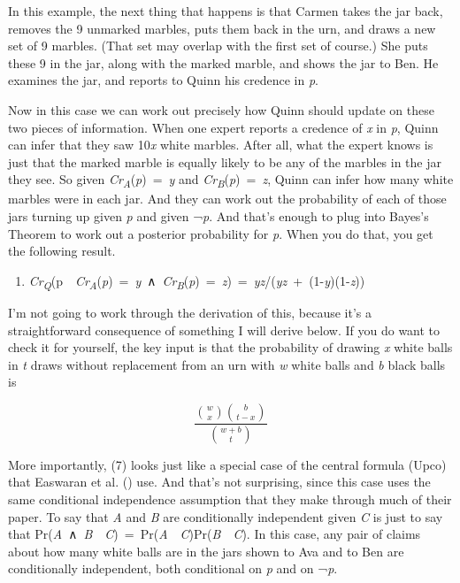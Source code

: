 \documentclass[
  11pt,
  letterpaper,
  DIV=11,
  numbers=noendperiod,
  twoside]{scrartcl}
\providecommand{\tightlist}{%
  \setlength{\itemsep}{0pt}\setlength{\parskip}{0pt}}
\begin{document}
In this example, the next thing that happens is that Carmen takes the
jar back, removes the 9 unmarked marbles, puts them back in the urn, and
draws a new set of 9 marbles. (That set may overlap with the first set
of course.) She puts these 9 in the jar, along with the marked marble,
and shows the jar to Ben. He examines the jar, and reports to Quinn his
credence in \emph{p}.

Now in this case we can work out precisely how Quinn should update on
these two pieces of information. When one expert reports a credence of
\emph{x} in \emph{p}, Quinn can infer that they saw 10\emph{x} white
marbles. After all, what the expert knows is just that the marked marble
is equally likely to be any of the marbles in the jar they see. So given
\emph{Cr\textsubscript{A}}(\emph{p})~=~\emph{y} and
\emph{Cr\textsubscript{B}}(\emph{p})~=~\emph{z}, Quinn can infer how
many white marbles were in each jar. And they can work out the
probability of each of those jars turning up given \emph{p} and given
¬\emph{p}. And that's enough to plug into Bayes's Theorem to work out a
posterior probability for \emph{p}. When you do that, you get the
following result.

\begin{enumerate}
\def\labelenumi{(\arabic{enumi})}
\setcounter{enumi}{6}
\tightlist
\item
  \emph{Cr\textsubscript{Q}}(p~\textbar~\emph{Cr\textsubscript{A}}(\emph{p})~=~\emph{y}~∧~\emph{Cr\textsubscript{B}}(\emph{p})~=~\emph{z})~=~\emph{yz}/(\emph{yz}~+~(1-\emph{y})(1-\emph{z}))
\end{enumerate}

I'm not going to work through the derivation of this, because it's a
straightforward consequence of something I will derive below. If you do
want to check it for yourself, the key input is that the probability of
drawing \emph{x} white balls in \emph{t} draws without replacement from
an urn with \emph{w} white balls and \emph{b} black balls is

\[
\frac{\binom{w}{x} \binom{b}{t-x}}{\binom{w+b}{t}}
\]

More importantly, (7) looks just like a special case of the central
formula (Upco) that Easwaran et al.
() use. And that's not surprising,
since this case uses the same conditional independence assumption that
they make through much of their paper. To say that \emph{A} and \emph{B}
are conditionally independent given \emph{C} is just to say that
Pr(\emph{A}~∧~\emph{B}~\textbar~\emph{C})~=~Pr(\emph{A}~\textbar~\emph{C})Pr(\emph{B}~\textbar~\emph{C}).
In this case, any pair of claims about how many white balls are in the
jars shown to Ava and to Ben are conditionally independent, both
conditional on \emph{p} and on ¬\emph{p}.
\end{document}
